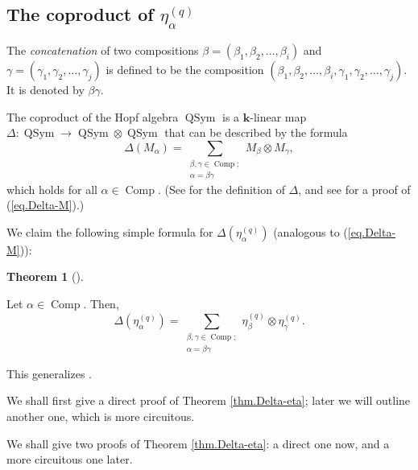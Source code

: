 \documentclass[numbers=enddot,12pt,final,onecolumn,notitlepage]{scrartcl}%
\theoremstyle{definition}
\newtheorem{theo}{Theorem}[section]
\newenvironment{theorem}[1][]
{\begin{theo}[#1]\begin{leftbar}}
{\end{leftbar}\end{theo}}
\let\sumnonlimits\sum
\renewcommand{\sum}{\sumnonlimits\limits}
\newenvironment{verlong}{}{}
\newenvironment{vershort}{}{}
\begin{document}
\subsection{The coproduct of $\eta_{\alpha}^{\left(  q\right)  }$}

The \emph{concatenation} of two compositions $\beta=\left(  \beta_{1}%
,\beta_{2},\ldots,\beta_{i}\right)  $ and $\gamma=\left(  \gamma_{1}%
,\gamma_{2},\ldots,\gamma_{j}\right)  $ is defined to be the composition
$\left(  \beta_{1},\beta_{2},\ldots,\beta_{i},\gamma_{1},\gamma_{2}%
,\ldots,\gamma_{j}\right)  $. It is denoted by $\beta\gamma$.

The coproduct of the Hopf algebra $\operatorname*{QSym}$ is a $\mathbf{k}%
$-linear map $\Delta:\operatorname*{QSym}\rightarrow\operatorname*{QSym}%
\otimes\operatorname*{QSym}$ that can be described by the formula%
\begin{equation}
\Delta\left(  M_{\alpha}\right)  =\sum_{\substack{\beta,\gamma\in
\operatorname*{Comp};\\\alpha=\beta\gamma}}M_{\beta}\otimes M_{\gamma},
\label{eq.Delta-M}%
\end{equation}
which holds for all $\alpha\in\operatorname*{Comp}$. (See \cite[\S 5.1]%
{GriRei} for the definition of $\Delta$, and see \cite[Proposition
5.1.7]{GriRei} for a proof of (\ref{eq.Delta-M}).)

We claim the following simple formula for $\Delta\left(  \eta_{\alpha
}^{\left(  q\right)  }\right)  $ (analogous to (\ref{eq.Delta-M})):

\begin{theorem}
\label{thm.Delta-eta}Let $\alpha\in\operatorname*{Comp}$. Then,%
\[
\Delta\left(  \eta_{\alpha}^{\left(  q\right)  }\right)  =\sum
_{\substack{\beta,\gamma\in\operatorname*{Comp};\\\alpha=\beta\gamma}%
}\eta_{\beta}^{\left(  q\right)  }\otimes\eta_{\gamma}^{\left(  q\right)  }.
\]

\end{theorem}

This generalizes \cite[Corollary 2.7]{Hsiao07}.

\begin{vershort}
We shall first give a direct proof of Theorem \ref{thm.Delta-eta}; later we
will outline another one, which is more circuitous.
\end{vershort}

\begin{verlong}
We shall give two proofs of Theorem \ref{thm.Delta-eta}: a direct one now, and
a more circuitous one later.
\end{verlong}
\end{document}
